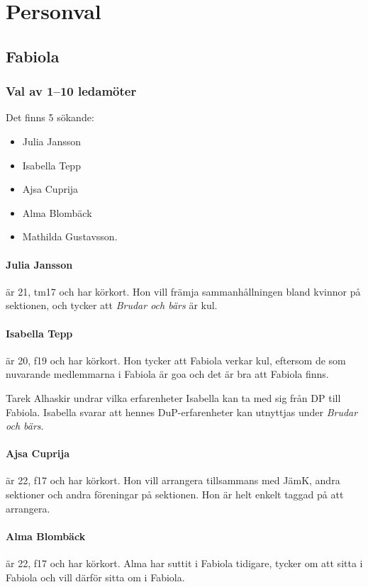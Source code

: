 \documentclass[hidelinks]{sektionsmote}
\begin{document}
\section{Personval}
\subsection{Fabiola}
\subsubsection{Val av 1--10 ledamöter}
Det finns 5 sökande:
\begin{itemize}
    \item Julia Jansson
    \item Isabella Tepp
    \item Ajsa Cuprija
    \item Alma Blombäck
    \item Mathilda Gustavsson.
\end{itemize}

\paragraph{Julia Jansson} är 21, tm17 och har körkort.
Hon vill främja sammanhållningen bland kvinnor på sektionen, och tycker att \textit{Brudar och bärs} är kul.

\paragraph{Isabella Tepp} är 20, f19 och har körkort.
Hon tycker att Fabiola verkar kul, eftersom de som nuvarande medlemmarna i Fabiola är goa och det är bra att Fabiola finns.

Tarek Alhaskir undrar vilka erfarenheter Isabella kan ta med sig från DP till Fabiola.
Isabella svarar att hennes DuP-erfarenheter kan utnyttjas under \textit{Brudar och bärs}.

\paragraph{Ajsa Cuprija} är 22, f17 och har körkort.
Hon vill arrangera tillsammans med JämK, andra sektioner och andra föreningar på sektionen.
Hon är helt enkelt taggad på att arrangera.

\paragraph{Alma Blombäck} är 22, f17 och har körkort.
Alma har suttit i Fabiola tidigare, tycker om att sitta i Fabiola och vill därför sitta om i Fabiola.
\end{document}
